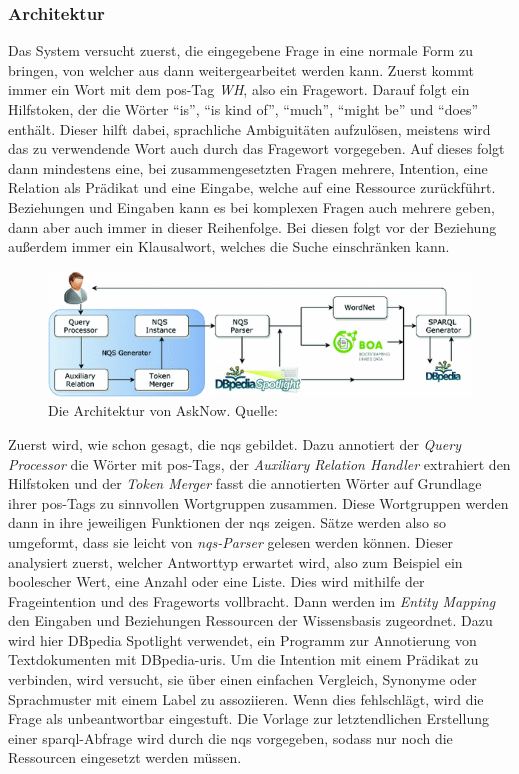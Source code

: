 \subsubsection{Architektur}

Das System versucht zuerst, die eingegebene Frage in eine normale Form zu bringen, von welcher aus dann weitergearbeitet werden kann.
Zuerst kommt immer ein Wort mit dem \ac{pos}-Tag \emph{WH}, also ein Fragewort.
Darauf folgt ein Hilfstoken, der die Wörter \enquote{is}, \enquote{is kind of}, \enquote{much}, \enquote{might be} und \enquote{does} enthält.
Dieser hilft dabei, sprachliche Ambiguitäten aufzulösen, meistens wird das zu verwendende Wort auch durch das Fragewort vorgegeben.
Auf dieses folgt dann mindestens eine, bei zusammengesetzten Fragen mehrere, Intention, eine Relation als Prädikat und eine Eingabe, welche auf eine Ressource zurückführt.
Beziehungen und Eingaben kann es bei komplexen Fragen auch mehrere geben, dann aber auch immer in dieser Reihenfolge.
Bei diesen folgt vor der Beziehung außerdem immer ein Klausalwort, welches die Suche einschränken kann.

\begin{figure}[htbp!]
\centering
\includegraphics[width=\textwidth, height=\textheight, keepaspectratio]{Images/AskNowArchitecture.png}
\caption[AskNow Architektur]{Die Architektur von AskNow. Quelle: \citet{asknow}}
\label{fig:asknow-architektur}
\end{figure}

Zuerst wird, wie schon gesagt, die \ac{nqs} gebildet.
Dazu annotiert der \emph{Query Processor} die Wörter mit \ac{pos}-Tags, der \emph{Auxiliary Relation Handler} extrahiert den Hilfstoken
und der \emph{Token Merger} fasst die annotierten Wörter auf Grundlage ihrer \ac{pos}-Tags zu sinnvollen Wortgruppen zusammen.
Diese Wortgruppen werden dann in ihre jeweiligen Funktionen der \ac{nqs} zeigen.
Sätze werden also so umgeformt, dass sie leicht von \emph{\ac{nqs}-Parser} gelesen werden können.
Dieser analysiert zuerst, welcher Antworttyp erwartet wird, also zum Beispiel ein boolescher Wert, eine Anzahl oder eine Liste.
Dies wird mithilfe der Frageintention und des Frageworts vollbracht.
Dann werden im \emph{Entity Mapping} den Eingaben und Beziehungen Ressourcen der Wissensbasis zugeordnet.
Dazu wird hier DBpedia Spotlight \citep{dbpediaspotlight} verwendet, ein Programm zur Annotierung von Textdokumenten mit DBpedia-\acp{uri}.
Um die Intention mit einem Prädikat zu verbinden, wird versucht, sie über einen einfachen Vergleich,
Synonyme \citep{wordnet} oder Sprachmuster \citep{boapatternlibrary} mit einem Label zu assoziieren.
Wenn dies fehlschlägt, wird die Frage als unbeantwortbar eingestuft.
Die Vorlage zur letztendlichen Erstellung einer \ac{sparql}-Abfrage wird durch die \ac{nqs} vorgegeben, sodass nur noch die Ressourcen eingesetzt werden müssen.
